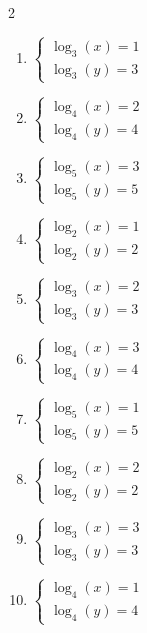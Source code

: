 \documentclass[12pt,a4paper]{article}
\begin{document}
\begin{multicols}{2}
\begin{enumerate}[leftmargin=*, itemsep=6pt]
\item \(\begin{cases} \log_{3}\left(x\right)=1\\ \log_{3}\left(y\right)=3\end{cases}\)

\item \(\begin{cases} \log_{4}\left(x\right)=2\\ \log_{4}\left(y\right)=4\end{cases}\)

\item \(\begin{cases} \log_{5}\left(x\right)=3\\ \log_{5}\left(y\right)=5\end{cases}\)

\item \(\begin{cases} \log_{2}\left(x\right)=1\\ \log_{2}\left(y\right)=2\end{cases}\)

\item \(\begin{cases} \log_{3}\left(x\right)=2\\ \log_{3}\left(y\right)=3\end{cases}\)

\item \(\begin{cases} \log_{4}\left(x\right)=3\\ \log_{4}\left(y\right)=4\end{cases}\)

\item \(\begin{cases} \log_{5}\left(x\right)=1\\ \log_{5}\left(y\right)=5\end{cases}\)

\item \(\begin{cases} \log_{2}\left(x\right)=2\\ \log_{2}\left(y\right)=2\end{cases}\)

\item \(\begin{cases} \log_{3}\left(x\right)=3\\ \log_{3}\left(y\right)=3\end{cases}\)

\item \(\begin{cases} \log_{4}\left(x\right)=1\\ \log_{4}\left(y\right)=4\end{cases}\)


\end{enumerate}
\end{multicols}
\end{document}
